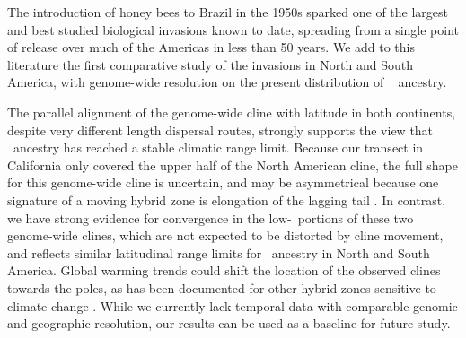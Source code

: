 The introduction of  honey bees to Brazil in the 1950s sparked one of the largest and best studied biological invasions known to date,  spreading from a single point of release over much of the Americas in less than 50 years. We add to this literature the first comparative study of the invasions in North and South America, with genome-wide resolution on the present distribution of \scutellata\  ancestry.

The parallel alignment of the genome-wide cline with latitude in both continents, despite very different length dispersal routes, strongly supports the view that \scutellata\ ancestry has reached a stable climatic range limit. Because our transect in California only covered the upper half of the North American cline, the full shape for this genome-wide cline is uncertain, and may be asymmetrical because one signature of a moving hybrid zone is elongation of the lagging tail \cite{buggs2007empirical}. In contrast, we have strong evidence for convergence in the  low-\A\ portions of these two genome-wide clines, which are not expected to be distorted by cline movement, and reflects similar latitudinal range limits for \scutellata\ ancestry in North and South America. Global warming trends could shift the location of the observed clines towards the poles, as has been documented for other hybrid zones sensitive to climate change \cite{Taylor:2015dq}. While we currently lack temporal data with comparable genomic and geographic resolution, our results can be used as a baseline for future study. 

